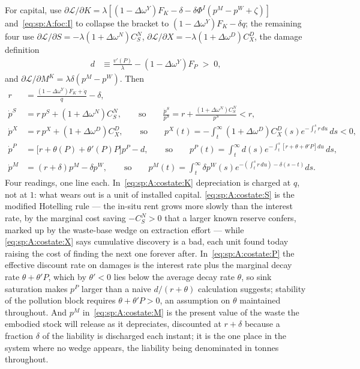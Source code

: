 For capital, use
$\partial\mathcal L/\partial K=\lambda\left[\left(1-\Delta\omega^Y\right)F_K-\delta
-\delta\Phi^I\left(p^M-p^W+\zeta\right)\right]$ and~\eqref{eq:sp:A:foc:I} to collapse the bracket to
$\left(1-\Delta\omega^Y\right)F_K-\delta q$; the remaining four use
$\partial\mathcal L/\partial S=-\lambda\left(1+\Delta\omega^N\right)C^N_S$,
$\partial\mathcal L/\partial X=-\lambda\left(1+\Delta\omega^D\right)C^D_X$, the damage definition
\begin{align}
d &\equiv \frac{v'\!\left(P\right)}{\lambda}-\left(1-\Delta\omega^Y\right)F_P\;>\;0,
\label{eq:sp:A:damage}
\end{align}
and $\partial\mathcal L/\partial M^K=\lambda\delta\left(p^M-p^W\right)$. Then
\begin{align}
r &= \frac{\left(1-\Delta\omega^Y\right)F_K+\dot q}{q}-\delta,
\label{eq:sp:A:costate:K}
\\[0.15em]
\dot p^S &= r\,p^S+\left(1+\Delta\omega^N\right)C^N_S,
\qquad\text{so}\qquad
\frac{\dot p^S}{p^S} = r+\frac{\left(1+\Delta\omega^N\right)C^N_S}{p^S}<r,
\label{eq:sp:A:costate:S}
\\[0.15em]
\dot p^X &= r\,p^X+\left(1+\Delta\omega^D\right)C^D_X,
\qquad\text{so}\qquad
p^X\left(t\right) = -\int_t^\infty \left(1+\Delta\omega^D\right)C^D_X\!\left(s\right)
e^{-\int_t^s r\,du}\,ds<0,
\label{eq:sp:A:costate:X}
\\[0.15em]
\dot p^P &= \Big[r+\theta\!\left(P\right)+\theta'\!\left(P\right)P\Big]p^P-d,
\qquad\text{so}\qquad
p^P\left(t\right)=\int_t^\infty d\left(s\right)
e^{-\int_t^s\left[r+\theta+\theta'P\right]du}\,ds,
\label{eq:sp:A:costate:P}
\\[0.15em]
\dot p^M &= \left(r+\delta\right)p^M-\delta p^W,
\qquad\text{so}\qquad
p^M\left(t\right)=\int_t^\infty \delta p^W\!\left(s\right)
e^{-\left(\int_t^s r\,du\right)-\delta\left(s-t\right)}ds.
\label{eq:sp:A:costate:M}
\end{align}
Four readings, one line each. In~\eqref{eq:sp:A:costate:K} depreciation is charged at $q$, not at
$1$: what wears out is a unit of installed capital. \eqref{eq:sp:A:costate:S} is the modified
Hotelling rule --- the in-situ rent grows more slowly than the interest rate, by the marginal cost
saving $-C^N_S>0$ that a larger known reserve confers, marked up by the waste-base wedge on
extraction effort --- while \eqref{eq:sp:A:costate:X} says cumulative discovery is a bad, each unit
found today raising the cost of finding the next one forever after. In~\eqref{eq:sp:A:costate:P} the
effective discount rate on damages is the interest rate plus the marginal decay rate
$\theta+\theta'P$, which by $\theta'<0$ lies below the average decay rate $\theta$, so sink
saturation makes $p^P$ larger than a naive $d/\left(r+\theta\right)$ calculation suggests; stability
of the pollution block requires $\theta+\theta'P>0$, an assumption on $\theta$ maintained throughout.
And $p^M$ in~\eqref{eq:sp:A:costate:M} is the present value of the waste the embodied stock will
release as it depreciates, discounted at $r+\delta$ because a fraction $\delta$ of the liability is
discharged each instant; it is the one place in the system where no wedge appears, the liability
being denominated in tonnes throughout.

